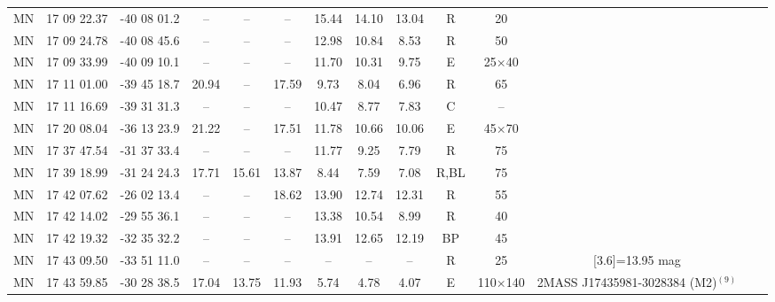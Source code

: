 \documentclass[useAMS]{mn2e}
\newcounter{qub}
\newcommand{\qq}{\addtocounter{qub}{1}\arabic{qub}}
\begin{document}
\begin{table*}
\begin{tabular}{lccccccccccccc}
MN\qq & 17 09 22.37 & -40 08 01.2 & -- & -- & -- & 15.44 & 14.10 & 13.04 & R & 20 &  \\
MN\qq & 17 09 24.78 & -40 08 45.6 & -- & -- & -- & 12.98 & 10.84 & 8.53 & R & 50 &  \\
MN\qq & 17 09 33.99 & -40 09 10.1 & -- & -- & -- & 11.70 & 10.31 & 9.75 & E & 25$\times$40&  \\
MN\qq & 17 11 01.00 & -39 45 18.7 & 20.94 & -- & 17.59 & 9.73 & 8.04 & 6.96 & R & 65 &  \\
MN\qq & 17 11 16.69 & -39 31 31.3 & -- & -- & -- & 10.47 & 8.77 & 7.83 & C & -- &  \\
MN\qq & 17 20 08.04 & -36 13 23.9 & 21.22 & -- & 17.51 & 11.78 & 10.66 & 10.06 & E & 45$\times$70 &  \\
MN\qq & 17 37 47.54 & -31 37 33.4 & -- & -- & -- & 11.77 & 9.25 & 7.79 & R & 75 &  \\
MN\qq & 17 39 18.99 & -31 24 24.3 & 17.71 & 15.61 & 13.87 & 8.44 & 7.59 & 7.08 & R,BL & 75 &  \\
MN\qq & 17 42 07.62 & -26 02 13.4 & -- & -- & 18.62 & 13.90 & 12.74 & 12.31 & R & 55 &  \\
MN\qq & 17 42 14.02 & -29 55 36.1 & -- & -- & -- & 13.38 & 10.54 & 8.99 & R & 40 &  \\
MN\qq & 17 42 19.32 & -32 35 32.2 & -- & -- & -- & 13.91 & 12.65 & 12.19 & BP & 45 &  \\
MN\qq & 17 43 09.50 & -33 51 11.0 & -- & -- & -- & -- & -- & -- & R & 25 & [3.6]=13.95 mag \\
MN\qq & 17 43 59.85 & -30 28 38.5 & 17.04 & 13.75 & 11.93 & 5.74 & 4.78 & 4.07 & E & 110$\times$140 & 2MASS J17435981-3028384 (M2)$^{(9)}$\\
\hline
\end{tabular}
\end{table*}
%
\end{document}
